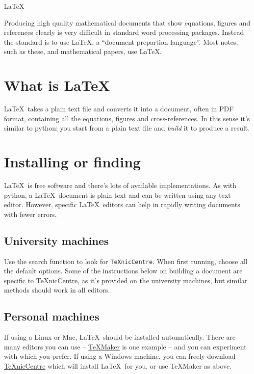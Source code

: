 \begin{chapter}{\LaTeX}

Producing high quality mathematical documents that show equations, figures and references clearly is very difficult in standard word processing packages. Instead the standard is to use \LaTeX, a ``document prepartion language''. Most notes, such as these, and mathematical papers, use \LaTeX.

\section{What is \LaTeX}

\LaTeX\ takes a plain text file and converts it into a document, often in PDF format, containing all the equations, figures and cross-references. In this sense it's similar to python: you start from a plain text file and \emph{build} it to produce a result.

\section{Installing or finding}

\LaTeX\ is free software and there's lots of available implementations. As with python, a \LaTeX\ document is plain text and can be written using any text editor. However, specific \LaTeX\ editors can help in rapidly writing documents with fewer errors.

\subsection{University machines}

Use the search function to look for \texttt{TeXnicCentre}. When first running, choose all the default options. Some of the instructions below on building a document are specific to TeXnicCentre, as it's provided on the university machines, but similar methods should work in all editors.

\subsection{Personal machines}

If using a Linux or Mac, \LaTeX\ should be installed automatically. There are many editors you can use -- \href{http://www.xm1math.net/texmaker/}{TeXMaker} is one example -- and you can experiment with which you prefer. If using a Windows machine, you can freely download \href{http://www.texniccenter.org/}{TeXnicCentre} which will install \LaTeX\ for you, or use TeXMaker as above.


\end{chapter}
